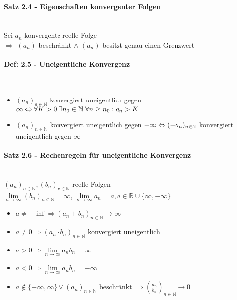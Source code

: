 \documentclass[paper=a3,paper=landscape, fontsize=9pt, DIV=30]{scrartcl}
\newcommand{\real}{{\mathbb{R}}}
\newcommand{\nat}{\mathbb{N}}
\newcommand{\aseq}{(a_n)_{n \in \nat}}
\newcommand{\bseq}{(b_n)_{n \in \nat}}
\begin{document}
\begin{multicols*}{4}
  \paragraph{Satz 2.4 - Eigenschaften konvergenter Folgen}\hspace{0pt} \\
  Sei $a_n$ konvergente reelle Folge\\
  $\Rightarrow$ $(a_n)$ beschränkt $\wedge$ $(a_n)$ besitzt genau einen Grenzwert

  \paragraph{Def: 2.5 - Uneigentliche Konvergenz}\hspace{0pt} \\
  \begin{itemize}
  	\item $(a_n)_{a \in \nat}$ konvergiert uneigentlich gegen $\infty \Leftrightarrow\\\forall K > 0 \; \exists n_0 \in \nat \; \forall n \geq n_0: a_n > K$
  	\item  $\aseq$ konvergiert uneigentlich gegen $-\infty \Leftrightarrow\\ (-a_n)_{n \in \nat}$ konvergiert uneigentlich gegen $\infty$
  \end{itemize}

  \paragraph{Satz 2.6 - Rechenregeln für uneigentliche Konvergenz}\hspace{0pt} \\
  $\aseq, \bseq$ reelle Folgen\\$\lim\limits_{n \rightarrow \infty} \bseq = \infty$, $\lim\limits_{n \rightarrow \infty} a_n = a, a \in \real \cup \{\infty, -\infty\}$

  \begin{itemize}
  \item $a \neq -\inf \Rightarrow (a_n+b_n)_{n \in \nat} \rightarrow \infty$
  \item $a \neq 0 \Rightarrow (a_n \cdot b_n)_{n \in \nat}$ konvergiert uneigentlich
  \item $a > 0 \Rightarrow \lim\limits_{n \rightarrow \infty} a_nb_n = \infty$
  \item $a < 0 \Rightarrow \lim\limits_{n \rightarrow \infty} a_nb_n = -\infty$
  \item $a \notin \{-\infty, \infty\} \vee \aseq \text{ beschränkt } \Rightarrow (\frac{a_n}{b_n})_{n \in \nat} \rightarrow 0$
  \end{itemize}


\end{multicols*}
\end{document}
